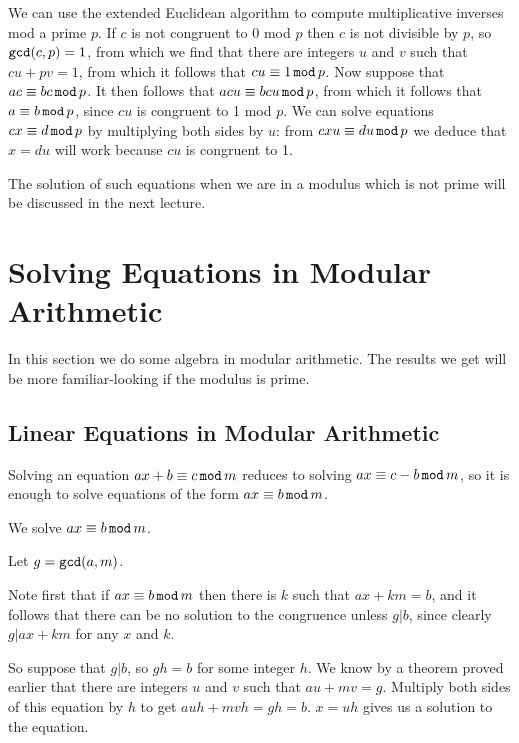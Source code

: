 \documentclass[12pt]{article}
\begin{document}
We can use the extended Euclidean algorithm to compute multiplicative inverses mod a prime $p$.
If $c$ is not congruent to 0 mod $p$ then $c$ is not divisible by $p$, so ${\tt gcd}(c,p)=1$, from which 
we find that there are integers $u$ and $v$ such that $cu+pv=1$, from which it follows that $cu \equiv 1\,{\tt mod}\, p$.  Now suppose that $ac\equiv bc\,{\tt mod}\,p$.  It then follows that $acu\equiv bcu\,{\tt mod}\,p$, from
which it follows that $a\equiv b\,{\tt mod}\,p$, since $cu$ is congruent to 1 mod $p$.  We can solve equations
$cx \equiv d \,{\tt mod}\,p$ by multiplying both sides by $u$:  from $cxu \equiv du \,{\tt mod}\,p$ we deduce that $x=du$ will work because $cu$ is congruent to 1.

The solution of such equations when we are in a modulus which is not prime will be discussed in the next lecture.

\section{Solving Equations in Modular Arithmetic}

In this section we do some algebra in modular arithmetic.  The results we get will be more familiar-looking if the modulus is prime.

\subsection{Linear Equations in Modular Arithmetic}

Solving an equation $ax + b \equiv c\,{\tt mod}\,m$ reduces to solving $ax \equiv c-b\,{\tt mod}\,m$, so it is enough to solve equations of the form $ax \equiv b\,{\tt mod}\,m$.

We solve $ax \equiv b\,{\tt mod}\,m$. 

Let $g={\tt gcd}(a,m)$.  

Note first that if $ax \equiv b\,{\tt mod}\,m$ then there is $k$ such that $ax+km=b$, and it follows that
there can be no solution to the congruence unless $g | b$, since clearly $g|ax+km$ for any $x$ and $k$.

So suppose that $g|b$, so $gh=b$ for some integer $h$.  We know by a theorem proved earlier that there are
integers $u$ and $v$ such that $au+mv=g$.   Multiply both sides of this equation by $h$ to get
$auh+mvh=gh=b$.  $x=uh$ gives us a solution to the equation.
\end{document}
